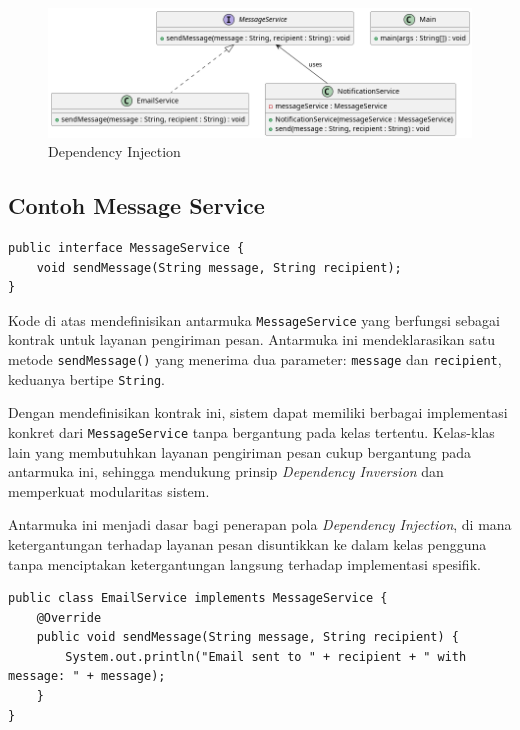 \begin{figure}[h]
 	\centering
 	\includegraphics[width=.9\textwidth]{../figures/out/dependency_injection.png}
 	\caption{Dependency Injection}
 	\label{fig:dependency-injection}
\end{figure}


\subsection{Contoh Message Service}

\begin{lstlisting}[style=JavaStyle, caption={Implementasi Dependency Injection dengan Constructor Injection}, label={lst:di-constructor}]
public interface MessageService {
	void sendMessage(String message, String recipient);
}
\end{lstlisting}

Kode di atas mendefinisikan antarmuka \texttt{MessageService} yang berfungsi sebagai kontrak untuk layanan pengiriman pesan. Antarmuka ini mendeklarasikan satu metode \texttt{sendMessage()} yang menerima dua parameter: \texttt{message} dan \texttt{recipient}, keduanya bertipe \texttt{String}. 

Dengan mendefinisikan kontrak ini, sistem dapat memiliki berbagai implementasi konkret dari \texttt{MessageService} tanpa bergantung pada kelas tertentu. Kelas-klas lain yang membutuhkan layanan pengiriman pesan cukup bergantung pada antarmuka ini, sehingga mendukung prinsip \textit{Dependency Inversion} dan memperkuat modularitas sistem.

Antarmuka ini menjadi dasar bagi penerapan pola \textit{Dependency Injection}, di mana ketergantungan terhadap layanan pesan disuntikkan ke dalam kelas pengguna tanpa menciptakan ketergantungan langsung terhadap implementasi spesifik.


\begin{lstlisting}[style=JavaStyle, caption={Implementasi Konkret dari MessageService}, label={lst:di-email-service}]
public class EmailService implements MessageService {
	@Override
	public void sendMessage(String message, String recipient) {
		System.out.println("Email sent to " + recipient + " with message: " + message);
	}
}
\end{lstlisting}

